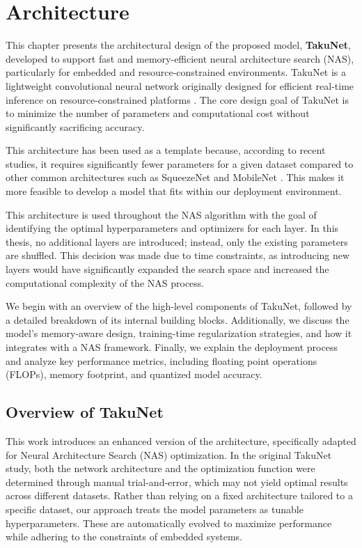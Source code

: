 \chapter{Architecture}

\label{chap:Architecture}
This chapter presents the architectural design of the proposed model, \textbf{TakuNet}, developed to support fast and memory-efficient neural architecture search (NAS), particularly for embedded and resource-constrained environments. 
TakuNet is a lightweight convolutional neural network originally designed for efficient real-time inference on resource-constrained platforms \cite{TakuNet}.
The core design goal of TakuNet is to minimize the number of parameters and computational cost without significantly sacrificing accuracy.

This architecture has been used as a template because, according to recent studies, it requires significantly fewer parameters for a given dataset compared to other common architectures such as SqueezeNet and MobileNet \cite{TakuNet}. This makes it more feasible to develop a model that fits within our deployment environment.

This architecture is used throughout the NAS algorithm with the goal of identifying the optimal hyperparameters and optimizers for each layer. In this thesis, no additional layers are introduced; instead, only the existing parameters are shuffled. This decision was made due to time constraints, as introducing new layers would have significantly expanded the search space and increased the computational complexity of the NAS process.

We begin with an overview of the high-level components of TakuNet, followed by a detailed breakdown of its internal building blocks. Additionally, we discuss the model’s memory-aware design, training-time regularization strategies, and how it integrates with a NAS framework. Finally, we explain the deployment process and analyze key performance metrics, including floating point operations (FLOPs), memory footprint, and quantized model accuracy.


\section{Overview of TakuNet}

This work introduces an enhanced version of the architecture, specifically adapted for Neural Architecture Search (NAS) optimization. In the original TakuNet study, both the network architecture and the optimization function were determined through manual trial-and-error, which may not yield optimal results across different datasets. Rather than relying on a fixed architecture tailored to a specific dataset, our approach treats the model parameters as tunable hyperparameters. These are automatically evolved to maximize performance while adhering to the constraints of embedded systems.

